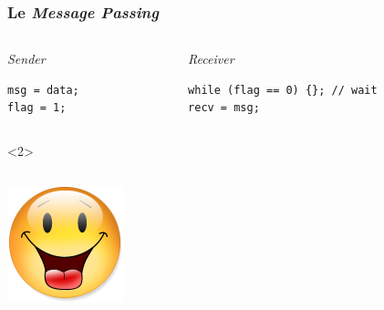 \documentclass[xcolor={x11names,svgnames}]{beamer}
\begin{document}
\begin{frame}[fragile, label=tso_mp]
  \frametitle{Le \emph{Message Passing} }
  
  \begin{columns}
    \begin{column}{0.5\textwidth}
      \begin{block}{\emph{Sender}}
\begin{verbatim}
msg = data;
flag = 1;
\end{verbatim}
      \end{block}
    \end{column}  
    \begin{column}{0.5\textwidth}
      \begin{block}{\emph{Receiver}}
\begin{verbatim}
while (flag == 0) {}; // wait
recv = msg;
\end{verbatim}
      \end{block}
    \end{column}
  \end{columns}

  \begin{overlayarea}{\textwidth}{1cm}
    \begin{onlyenv}<2>
      \begin{columns}[c]
        \begin{column}{.1\textwidth}
          \vspace{1mm}
          \includegraphics[width=\textwidth]{Content.png}
        \end{column}


\end{columns}
\end{onlyenv}
\end{overlayarea}
\end{frame}
\end{document}
